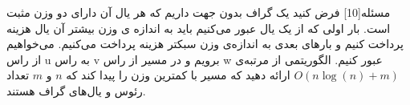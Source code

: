 
‌مسئله[10]
فرض کنید یک گراف بدون جهت داریم که هر یال آن دارای دو وزن مثبت است. بار اولی که از یک یال عبور می‌کنیم باید به اندازه ‌ی وزن بیشتر آن یال هزینه پرداخت کنیم و بارهای بعدی به اندازه‌ی وزن سبکتر هزینه پرداخت می‌کنیم. می‌خواهیم از راس u به راس v برویم و در مسیر از راس w عبور کنیم. الگوریتمی از مرتبه‌ی $O(n\log(n) + m)$ ارائه دهید که مسیر با کمترین وزن را پیدا کند که $n$ و $m$ تعداد رئوس و یال‌های گراف هستند.



